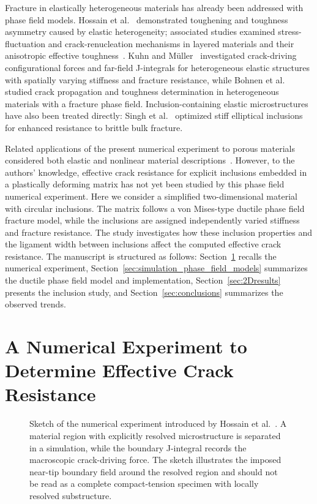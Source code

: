 \documentclass[pamm,a4paper,fleqn]{w-art}
\newcommand{\added}[2][]{#2}
\begin{document}
Fracture in elastically heterogeneous materials has already been
addressed with phase field models. Hossain et
al.~\cite{hossain_effective_2014} demonstrated toughening and
toughness asymmetry caused by elastic heterogeneity; associated
studies examined stress-fluctuation and crack-renucleation mechanisms
in layered materials and their anisotropic effective
toughness~\cite{hsueh_stress_2018,brach_anisotropy_2019}. Kuhn and
M\"uller~\cite{kuhn_discussion_2016} investigated crack-driving
configurational forces and far-field J-integrals for heterogeneous
elastic structures with spatially varying stiffness and fracture
resistance, while Bohnen et al.~\cite{bohnen_simulation_2024} studied
crack propagation and toughness determination in heterogeneous
materials with a fracture phase field. Inclusion-containing elastic
microstructures have also been treated directly: Singh et
al.~\cite{singh_optimization_2023} optimized stiff elliptical
inclusions for enhanced resistance to brittle bulk fracture.

Related applications of the present numerical experiment to porous
materials considered both elastic and nonlinear material
descriptions~\cite{schluter_determination_2025,%
  schluter_influence_2025}.
However, to the authors' knowledge, effective crack resistance for
explicit inclusions embedded in a plastically deforming matrix has
not yet been studied by this phase field numerical experiment. Here
we consider a simplified two-dimensional material with circular
inclusions. The matrix follows a von Mises-type
ductile phase field fracture model, while the inclusions are assigned
independently varied stiffness and fracture resistance. The study
investigates how these inclusion properties and the ligament width
between
inclusions affect the computed effective crack resistance. The
manuscript is structured as follows:
Section~\ref{sec:numericalExperiment}
recalls the numerical experiment,
Section~\ref{sec:simulation_phase_field_models} summarizes the
ductile phase field model and implementation,
Section~\ref{sec:2Dresults} presents the inclusion study, and
Section~\ref{sec:conclusions} summarizes the observed trends.

\section{A Numerical Experiment to Determine Effective Crack
  Resistance}\label{sec:numericalExperiment}

\begin{figure}[H]
  \centering
  \resizebox{0.6\textwidth}{!}{}
  \caption{Sketch of the numerical experiment introduced by Hossain
    et al.~\cite{hossain_effective_2014}. A material region with
    explicitly resolved microstructure is separated in a simulation,
    while the boundary J-integral records the macroscopic
    crack-driving force. \added{The sketch illustrates the imposed near-tip
    boundary field around the resolved region and should not be read
    as a complete compact-tension specimen with locally resolved
    substructure.}}
  \label{fig:numerical_experiment}
\end{figure}
\end{document}
